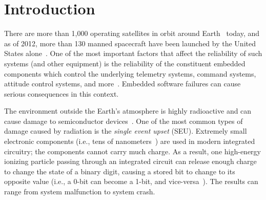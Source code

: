 \section{Introduction}\label{sec:introduction}
There are more than 1,000 operating satellites in orbit around Earth~\cite{satellite:total} today, and 
as of 2012, more than 130 manned spacecraft have been launched by the United States alone~\cite{space:shuttle:list}. 
One of the most important factors that affect the reliability of such systems 
(and other equipment) is the 
reliability of the constituent embedded components which control the underlying telemetry systems, command systems, attitude control systems, and more~\cite{fundamentals:space}. 
Embedded software failures can cause serious consequences in this context. 

The environment outside the Earth's atmosphere is highly radioactive 
and can cause damage to semiconductor devices~\cite{fundamentals:space}. One of the most common types of damage caused by radiation is the \textit{single event upset} (SEU). Extremely small electronic components (i.e., tens of nanometers~\cite{intel:chip:size}) are used in modern integrated circuitry; the components cannot carry much charge. As a result, one high-energy ionizing particle passing through an integrated circuit can release enough charge to change the state of a binary digit, causing a stored bit to change to its opposite value (i.e., a 0-bit can become a 1-bit, and vice-versa~\cite{fundamentals:space}). The
results can range from system malfunction to system crash.

